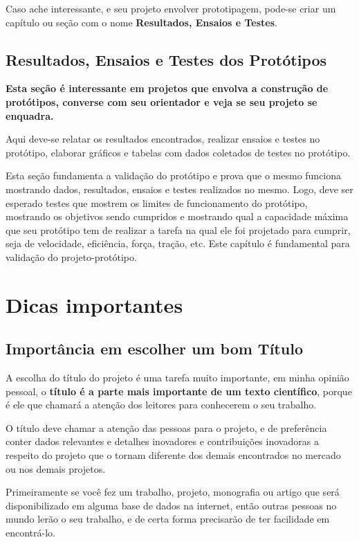 Caso ache interessante, e seu projeto envolver prototipagem, pode-se criar um capítulo ou seção com o nome {\bf Resultados, Ensaios e Testes}.


\section{Resultados, Ensaios e Testes dos Protótipos}

{\bf Esta seção é interessante em projetos que envolva a construção de protótipos, converse com seu orientador e veja se seu projeto se enquadra.}

Aqui deve-se relatar os resultados encontrados, realizar ensaios e testes no protótipo, elaborar gráficos e tabelas com dados coletados de testes no protótipo.

Esta seção fundamenta a validação do protótipo e prova que o mesmo funciona mostrando dados, resultados, ensaios e testes realizados no mesmo. Logo, deve ser esperado testes que mostrem os limites de funcionamento do protótipo, mostrando os objetivos sendo cumpridos e mostrando qual a capacidade máxima que seu protótipo tem de realizar a tarefa na qual
ele foi projetado para cumprir, seja de velocidade, eficiência, força, tração, etc. Este capítulo é fundamental para validação do projeto-protótipo.


\chapter{Dicas importantes}

\section{Importância em escolher um bom Título}

A escolha do título do projeto é uma tarefa muito importante, em minha opinião pessoal, o {\bf título é a parte mais importante de um texto científico}, porque é ele que chamará a atenção dos leitores para conhecerem o seu trabalho.

O título deve chamar a atenção das pessoas para o projeto, e de preferência conter dados relevantes e detalhes inovadores e contribuições inovadoras a respeito do projeto que o tornam diferente dos demais encontrados no mercado ou nos demais projetos.

Primeiramente se você fez um trabalho, projeto, monografia ou artigo que será disponibilizado em alguma base de dados na internet, então outras pessoas no mundo lerão o seu trabalho, e de certa forma precisarão de ter facilidade em encontrá-lo.

